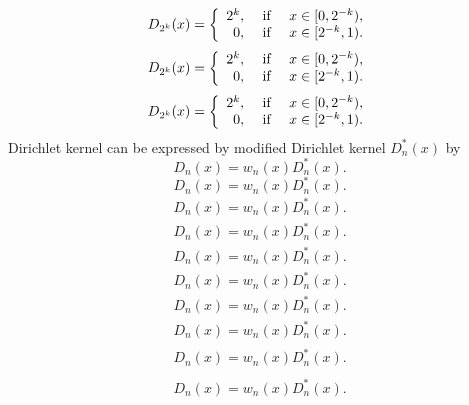 \documentclass{amsart}
\numberwithin{equation}{section}
\begin{document}
{\begin{multline}
D_{2^k}(x)=\left\{
\begin{array}{rcl}
2^k, &\hbox{ if }& x\in[0,2^{-k}),\\
0, &\hbox{ if }& x\in[2^{-k},1).
\end{array}
\right.
\end{multline}\fi  
{}\begin{multline*}\begin{split}
D_{2^k}(x)=\left\{
\begin{array}{rcl}
2^k, &\hbox{ if }& x\in[0,2^{-k}),\\
0, &\hbox{ if }& x\in[2^{-k},1).
\end{array}
\right.
\end{split}\end{multline*}\fi
{}\begin{multline}\begin{split}
D_{2^k}(x)=\left\{
\begin{array}{rcl}
2^k, &\hbox{ if }& x\in[0,2^{-k}),\\
0, &\hbox{ if }& x\in[2^{-k},1).
\end{array}
\right.
\end{split}\end{multline}\fi
}
Dirichlet kernel can be expressed by modified Dirichlet kernel $D_n^*(x)$ by
{
\begin{equation*} 
D_n(x)=w_n(x)D_n^*(x).
 \end{equation*}\fi  
{}\begin{equation}
D_n(x)=w_n(x)D_n^*(x).
\end{equation}\fi   
{}\begin{align*}
D_n(x)=w_n(x)D_n^*(x).
\end{align*}\fi   
{}\begin{align}
D_n(x)=w_n(x)D_n^*(x).
\end{align}\fi    
{}\begin{gather*}
D_n(x)=w_n(x)D_n^*(x).
\end{gather*}\fi  
{}\begin{gather}
D_n(x)=w_n(x)D_n^*(x).
\end{gather}\fi   
{}\begin{multline*}
D_n(x)=w_n(x)D_n^*(x).
\end{multline*}\fi  
{}\begin{multline}
D_n(x)=w_n(x)D_n^*(x).
\end{multline}\fi  
{}\begin{multline*}\begin{split}
D_n(x)=w_n(x)D_n^*(x).
\end{split}\end{multline*}\fi
{}\begin{multline}\begin{split}
D_n(x)=w_n(x)D_n^*(x).
\end{split}\end{multline}\fi
}
\end{document}
